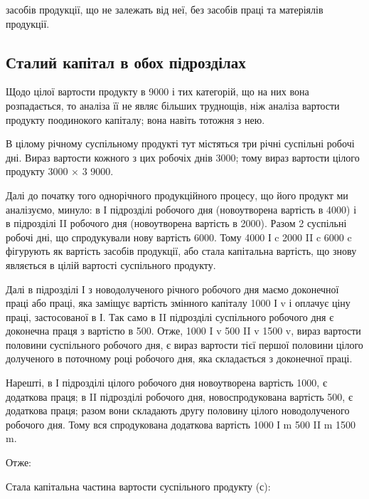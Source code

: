 \parcont{}  %
засобів продукції, що не залежать від неї, без засобів праці та матеріялів
продукції.

\subsection{Сталий капітал в обох підрозділах}

Щодо цілої вартости продукту в 9000 і тих категорій, що на них
вона розпадається, то аналіза її не являє більших труднощів, ніж аналіза
вартости продукту поодинокого капіталу; вона навіть тотожня з нею.

В цілому річному суспільному продукті тут містяться три річні суспільні
робочі дні. Вираз вартости кожного з цих робочіх днів \deq{} 3000; тому
вираз вартости цілого продукту 3000 × 3 \deq{} 9000.

Далі до початку того однорічного продукційного процесу, що його
продукт ми аналізуємо, минуло: в І підрозділі  робочого дня (новоутворена
вартість в 4000) і в підрозділі II  робочого дня (новоутворена
вартість в 2000). Разом 2 суспільні робочі дні, що спродукували
нову вартість \deq{} 6000. Тому 4000 І c \dplus{} 2000 II c \deq{} 6000 c фігурують
як вартість засобів продукції, або стала капітальна вартість, що
знову являється в цілій вартості суспільного продукту.

Далі в підрозділі І з новодолученого річного робочого дня маємо 
доконечної праці або праці, яка заміщує вартість змінного капіталу 1000
І v і оплачує ціну праці, застосованої в І. Так само в II підрозділі  суспільного
робочого дня є доконечна праця з вартістю в 500. Отже, 1000
I v \dplus{} 500 II v \deq{} 1500 v, вираз вартости половини суспільного робочого
дня, є вираз вартости тієї першої половини цілого долученого в поточному
році робочого дня, яка складається з доконечної праці.

Нарешті, в І підрозділі  цілого робочого дня новоутворена вартість \deq{}
1000, є додаткова праця; в II підрозділі  робочого дня, новоспродукована
вартість \deq{} 500, є додаткова праця; разом вони складають другу
половину цілого новодолученого робочого дня. Тому вся спродукована
додаткова вартість \deq{} 1000 І m \dplus{} 500 II m \deq{} 1500 m.

Отже:

Стала капітальна частина вартости суспільного продукту (с):

